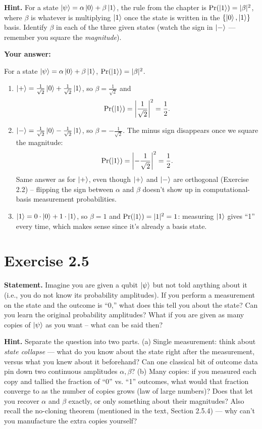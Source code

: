 \documentclass[11pt]{article}
\begin{document}
\textbf{Hint.} For a state $\ket{\psi} = \alpha\ket{0} + \beta\ket{1}$, the rule from the chapter is $\Pr(\ket{1}) = |\beta|^2$, where $\beta$ is whatever is multiplying $\ket{1}$ once the state is written in the $\{\ket{0},\ket{1}\}$ basis. Identify $\beta$ in each of the three given states (watch the sign in $\ket{-}$ — remember you square the \emph{magnitude}).

\textbf{Your answer:}

For a state $\ket{\psi} = \alpha\ket{0} + \beta\ket{1}$, $\Pr(\ket{1}) = |\beta|^2$.
\begin{enumerate}
    \item $\ket{+} = \frac{1}{\sqrt2}\ket{0} + \frac{1}{\sqrt2}\ket{1}$, so $\beta = \frac{1}{\sqrt2}$ and
    \[
    \Pr(\ket{1}) = \left|\frac{1}{\sqrt2}\right|^2 = \frac12.
    \]
    \item $\ket{-} = \frac{1}{\sqrt2}\ket{0} - \frac{1}{\sqrt2}\ket{1}$, so $\beta = -\frac{1}{\sqrt2}$. The minus sign disappears once we square the magnitude:
    \[
    \Pr(\ket{1}) = \left|-\frac{1}{\sqrt2}\right|^2 = \frac12.
    \]
    Same answer as for $\ket{+}$, even though $\ket+$ and $\ket-$ are orthogonal (Exercise 2.2) -- flipping the sign between $\alpha$ and $\beta$ doesn't show up in computational-basis measurement probabilities.
    \item $\ket{1} = 0\cdot\ket{0} + 1\cdot\ket{1}$, so $\beta = 1$ and $\Pr(\ket{1}) = |1|^2 = 1$: measuring $\ket1$ gives ``1'' every time, which makes sense since it's already a basis state.
\end{enumerate}

\vspace{2cm}

\section*{Exercise 2.5}
\textbf{Statement.} Imagine you are given a qubit $\ket{\psi}$ but not told anything about it (i.e., you do not know its probability amplitudes). If you perform a measurement on the state and the outcome is ``0,'' what does this tell you about the state? Can you learn the original probability amplitudes? What if you are given as many copies of $\ket{\psi}$ as you want -- what can be said then?

\textbf{Hint.} Separate the question into two parts. (a) Single measurement: think about \emph{state collapse} — what do you know about the state right after the measurement, versus what you knew about it beforehand? Can one classical bit of outcome data pin down two continuous amplitudes $\alpha,\beta$? (b) Many copies: if you measured each copy and tallied the fraction of ``0'' vs. ``1'' outcomes, what would that fraction converge to as the number of copies grows (law of large numbers)? Does that let you recover $\alpha$ and $\beta$ exactly, or only something about their magnitudes? Also recall the no-cloning theorem (mentioned in the text, Section 2.5.4) — why can't you manufacture the extra copies yourself?
\end{document}
